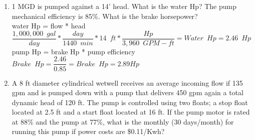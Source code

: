 \begin{enumerate}[1.]
\item 1 MGD is pumped against a 14’ head.  What is the water Hp?  The pump mechanical efficiency is 85\%.  What is the brake horsepower?\\
\vspace{0.4cm}
water Hp = flow * head\\
\vspace{0.4cm}
$\dfrac{1,000,000 \enspace gal}{day}*\dfrac{day}{1440 \enspace min}*14 \enspace ft*\dfrac{Hp}{3,960 \enspace GPM-ft}=\boxed{Water \enspace Hp = 2.46 \enspace Hp}$\\
\vspace{0.4cm}
pump Hp = brake Hp * pump efficiency\\
\vspace{0.4cm}
$Brake \enspace Hp = \dfrac{2.46}{0.85}=\boxed{Brake \enspace Hp=2.89Hp}$\\

\vspace{0.4cm}

\item A 8 ft diameter cylindrical wetwell receives an average incoming flow if 135 gpm and is pumped down with a pump that delivers 450 gpm again a total dynamic head of 120 ft.  The pump is controlled using two floats; a stop float located at 2.5 ft and a start float located at 16 ft.  If the pump motor is rated at 88\% and the pump at 77\%, what is the monthly (30 days/month) for running this pump if power costs are \$0.11/Kwh?\\



\end{enumerate}
